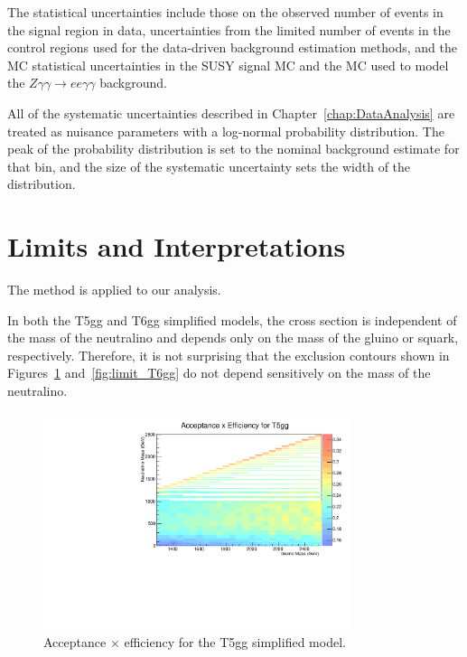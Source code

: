 The statistical uncertainties include those on the 
observed number of events in the signal region in data, uncertainties from the limited number of events
in the control regions used for the data-driven background estimation methods, and the MC statistical uncertainties 
in the SUSY signal MC and the MC used to model the $Z\gamma\gamma\rightarrow ee \gamma\gamma$ 
background.

All of the systematic uncertainties described in Chapter~\ref{chap:DataAnalysis} are treated as nuisance parameters
with a log-normal probability distribution. The peak of the probability distribution 
is set to the nominal background estimate for that bin, and the size of the systematic uncertainty 
sets the width of the distribution. 

\section{Limits and Interpretations}
\label{sec:limits}

The \cls method \cite{Junk:1999kv, Read:2002hq} is applied to our analysis.

In both the T5gg and T6gg simplified models, the cross section is independent of the mass of the neutralino and 
depends only on the mass of the gluino or squark, respectively. Therefore, it is not surprising that the exclusion contours
shown in Figures~\ref{fig:limit_T5gg} and~\ref{fig:limit_T6gg}
do not depend sensitively on the mass of the neutralino. 

\begin{figure}[h]
\begin{center}
\includegraphics[width=0.8\textwidth]{Figures/Results/accXeff_T5gg.pdf}
\end{center}
    \caption{Acceptance $\times$ efficiency for the T5gg simplified model.}
    \label{fig:limit_T5gg}
\end{figure}

